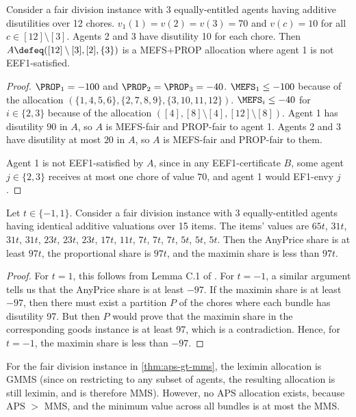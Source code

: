 \begin{lemma}
\label{cex:mefs-not-eef1-chores}
Consider a fair division instance with 3 equally-entitled agents
having additive disutilities over 12 chores.
$v_1(1) = v(2) = v(3) = 70$ and $v(c) = 10$ for all $c \in [12] \setminus [3]$.
Agents 2 and 3 have disutility 10 for each chore.
Then $A \defeq ([12] \setminus [3], [2], \{3\})$ is a MEFS+PROP allocation
where agent 1 is not EEF1-satisfied.
\end{lemma}
\begin{proof}
$\PROP_1 = -100$ and $\PROP_2 = \PROP_3 = -40$.
$\MEFS_1 \le -100$ because of the allocation $(\{1, 4, 5, 6\}, \{2, 7, 8, 9\}, \{3, 10, 11, 12\})$.
$\MEFS_i \le -40$ for $i \in \{2, 3\}$ because of the allocation
$([4], [8] \setminus [4], [12] \setminus [8])$.
Agent 1 has disutility $90$ in $A$, so $A$ is MEFS-fair and PROP-fair to agent 1.
Agents 2 and 3 have disutility at most $20$ in $A$, so $A$ is MEFS-fair and PROP-fair to them.

Agent 1 is not EEF1-satisfied by $A$, since in any EEF1-certificate $B$,
some agent $j \in \{2, 3\}$ receives at most one chore of value $70$,
and agent 1 would EF1-envy $j$.
\end{proof}

\begin{lemma}
\label{thm:aps-gt-mms}
Let $t \in \{-1, 1\}$.
Consider a fair division instance with 3 equally-entitled agents
having identical additive valuations over 15 items. The items' values are
$65t$, $31t$, $31t$, $31t$, $23t$, $23t$, $23t$, $17t$, $11t$, $7t$, $7t$, $7t$, $5t$, $5t$, $5t$.
Then the AnyPrice share is at least $97t$, the proportional share is $97t$,
and the maximin share is less than $97t$.
\end{lemma}
\begin{proof}
For $t = 1$, this follows from Lemma C.1 of \cite{babaioff2023fair}.
For $t = -1$, a similar argument tells us that the AnyPrice share is at least $-97$.
If the maximin share is at least $-97$, then there must exist a partition $P$ of the chores
where each bundle has disutility 97. But then $P$ would prove that the maximin share
in the corresponding goods instance is at least 97, which is a contradiction.
Hence, for $t = -1$, the maximin share is less than $-97$.
\end{proof}

\begin{example}
\label{cex:gmms-not-aps}
For the fair division instance in \cref{thm:aps-gt-mms},
the leximin allocation is GMMS (since on restricting to any subset of agents,
the resulting allocation is still leximin, and is therefore MMS).
However, no APS allocation exists, because APS $>$ MMS,
and the minimum value across all bundles is at most the MMS.
\end{example}


